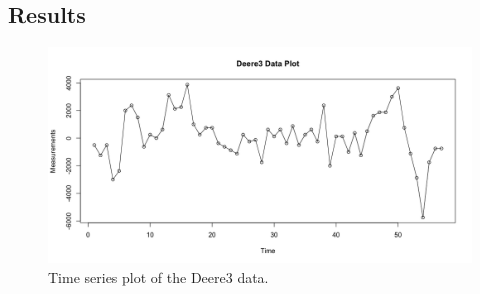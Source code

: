 \subsection{Results}
\begin{figure}[!htb]
    \centering
    \includegraphics[width=0.9\linewidth]{Images/P2/TS_Plot_P2.png}
    \caption{Time series plot of the Deere3 data.}
    \label{fig:deere3}
\end{figure}
